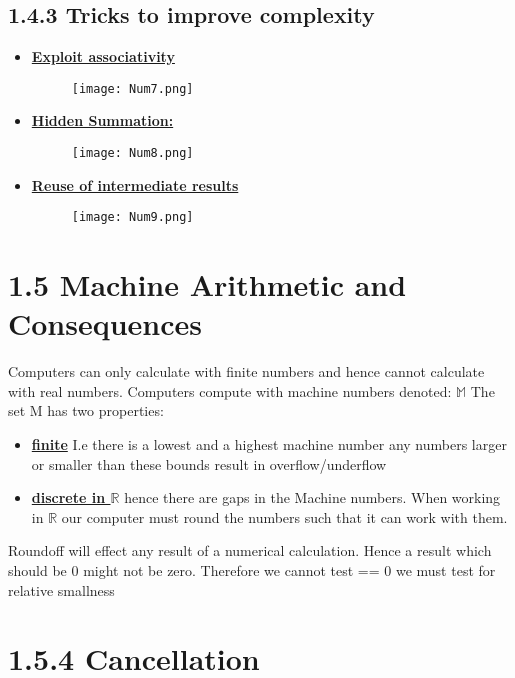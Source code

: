 \documentclass[8pt]{extreport}
\begin{document}
\subsection{1.4.3 Tricks to improve complexity}
\begin{itemize}
\item \underline{\textbf{Exploit associativity}} 
\begin{figure}[H]
\centering
\texttt{[image: Num7.png]}
\end{figure}
\item \underline{\textbf{Hidden Summation:}}
\begin{figure}[H]
\centering
\texttt{[image: Num8.png]}
\end{figure}
\item \underline{\textbf{Reuse of intermediate results}} 
\begin{figure}[H]
\centering
\texttt{[image: Num9.png]}
\end{figure}

\end{itemize}

\section{1.5 Machine Arithmetic and Consequences}
 
Computers can only calculate with finite numbers and hence cannot calculate with real numbers. Computers compute with machine numbers denoted: $\mathbb{M}$ The set M has two properties:
\begin{itemize}
\item \underline{\textbf{finite}} I.e there is a lowest and a highest machine number any numbers larger or smaller than these bounds result in overflow/underflow
\item \underline{\textbf{discrete in $\mathbb{R}$}} hence there are gaps in the Machine numbers. When working in $\mathbb{R}$ our computer must round the numbers such that it can work with them. 
\end{itemize}

Roundoff will effect any result of a numerical calculation. Hence a result which should be 0 might not be zero. Therefore we cannot test == 0 we must test for relative smallness

\section{1.5.4 Cancellation}
\end{document}
